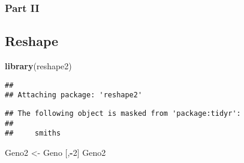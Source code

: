 \documentclass[]{article}
\newenvironment{Shaded}{\begin{snugshade}}{\end{snugshade}}
\newcommand{\KeywordTok}[1]{\textcolor[rgb]{0.13,0.29,0.53}{\textbf{#1}}}
\newcommand{\DataTypeTok}[1]{\textcolor[rgb]{0.13,0.29,0.53}{#1}}
\newcommand{\DecValTok}[1]{\textcolor[rgb]{0.00,0.00,0.81}{#1}}
\newcommand{\StringTok}[1]{\textcolor[rgb]{0.31,0.60,0.02}{#1}}
\newcommand{\CommentTok}[1]{\textcolor[rgb]{0.56,0.35,0.01}{\textit{#1}}}
\newcommand{\ControlFlowTok}[1]{\textcolor[rgb]{0.13,0.29,0.53}{\textbf{#1}}}
\newcommand{\OperatorTok}[1]{\textcolor[rgb]{0.81,0.36,0.00}{\textbf{#1}}}
\newcommand{\NormalTok}[1]{#1}
\begin{document}
\begin{Shaded}
\end{Shaded}

\subsubsection{Part II}\label{part-ii}

\subsection{Reshape}\label{reshape}

\begin{Shaded}
\begin{Highlighting}[]
\KeywordTok{library}\NormalTok{(reshape2)}
\end{Highlighting}
\end{Shaded}

\begin{verbatim}
## 
## Attaching package: 'reshape2'
\end{verbatim}

\begin{verbatim}
## The following object is masked from 'package:tidyr':
## 
##     smiths
\end{verbatim}

\begin{Shaded}
\begin{Highlighting}[]
\NormalTok{Geno2 <-}\StringTok{ }\NormalTok{Geno [,}\OperatorTok{-}\DecValTok{2}\NormalTok{]}
\NormalTok{Geno2}
\end{Highlighting}
\end{Shaded}
\end{document}

